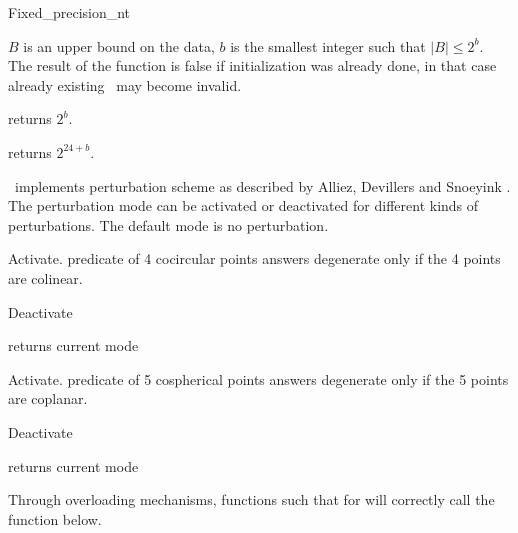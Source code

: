\begin{ccRefClass}{Fixed_precision_nt}

{$B$ is an upper bound on the data, $b$ is the smallest integer such that 
$|B|\leq 2^b$. The result of the function is false if initialization was
already done, in that case already existing \ccClassName\ may become invalid.}

{returns $2^b$.}

{returns $2^{24+b}$.}


\ccClassName\ implements perturbation scheme as described by
Alliez, Devillers and Snoeyink \cite{ads-rdppw-98}.
The perturbation mode can be activated or deactivated for different kinds
of perturbations. The default mode is no perturbation.

{Activate.  predicate
 of 4 cocircular points answers degenerate only if
the 4 points are colinear.}

{Deactivate}

{returns current mode}

{Activate.  predicate
 of 5 cospherical points answers degenerate only if
the 5 points are coplanar.}

{Deactivate}

{returns current mode}


Through overloading mechanisms, functions such that
 for 
will correctly call the function below.



\end{ccRefClass}
